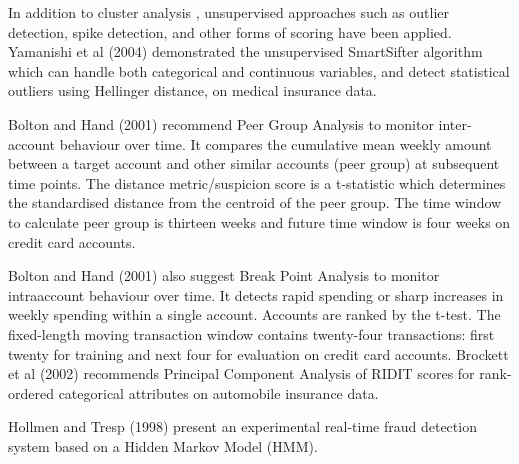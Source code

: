\par
In addition to cluster analysis , unsupervised approaches such as outlier
detection, spike detection, and other forms of scoring have been applied.
Yamanishi et al (2004) demonstrated the unsupervised SmartSifter algorithm
which can handle both categorical and continuous variables, and detect
statistical outliers using Hellinger distance, on medical insurance data.

\par
Bolton and Hand (2001) recommend Peer Group Analysis to monitor inter-account
behaviour over time. It compares the cumulative mean weekly amount between a
target account and other similar accounts (peer group) at subsequent time
points. The distance metric/suspicion score is a t-statistic which determines
the standardised distance from the centroid of the peer group. The time
window to calculate peer group is thirteen weeks and future time window is
four weeks on credit card accounts.

\par Bolton and Hand (2001) also suggest
Break Point Analysis to monitor intraaccount behaviour over time. It detects
rapid spending or sharp increases in weekly spending within a single account.
Accounts are ranked by the t-test. The fixed-length moving transaction window
contains twenty-four transactions: first twenty for training and next four
for evaluation on credit card accounts. Brockett et al (2002) recommends
Principal Component Analysis of RIDIT scores for rank-ordered categorical
attributes on automobile insurance data.

\par
Hollmen and Tresp (1998) present an experimental real-time fraud detection
system based on a Hidden Markov Model (HMM).


